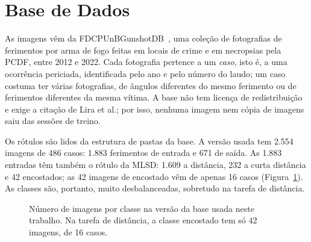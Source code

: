 \section{Base de Dados}
\label{sec:dataset_desc}

As imagens vêm da FDCPUnBGunshotDB~\cite{Lira2025deep,fdcpunbgunshotdb}, uma coleção de fotografias de ferimentos por arma de fogo feitas em locais de crime e em necropsias pela \gls{PCDF}, entre 2012 e 2022. Cada fotografia pertence a um \emph{caso}, isto é, a uma ocorrência periciada, identificada pelo ano e pelo número do laudo; um caso costuma ter várias fotografias, de ângulos diferentes do mesmo ferimento ou de ferimentos diferentes da mesma vítima. A base não tem licença de redistribuição e exige a citação de Lira et al.; por isso, nenhuma imagem nem cópia de imagens saiu das sessões de treino.

Os rótulos são lidos da estrutura de pastas da base. A versão usada tem 2.554 imagens de 486 casos: 1.883 ferimentos de entrada e 671 de saída. As 1.883 entradas têm também o rótulo da \gls{MLSD}: 1.609 a distância, 232 a curta distância e 42 encostados; as 42 imagens de encostado vêm de apenas 16 casos (Figura~\ref{fig:classes}). As classes são, portanto, muito desbalanceadas, sobretudo na tarefa de distância.

\begin{figure}[htpb]
\centering
{}
\caption{Número de imagens por classe na versão da base usada neste trabalho. Na tarefa de distância, a classe encostado tem só 42 imagens, de 16 casos.}
\label{fig:classes}
\end{figure}

